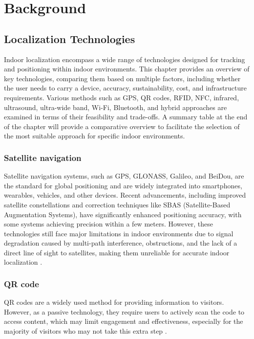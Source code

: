 \chapter{Background}
\label{chap:background}

\section{Localization Technologies}

Indoor localization encompass a wide range of technologies designed for tracking and positioning within indoor environments. This chapter provides an overview of key technologies, comparing them based on multiple factors, including whether the user needs to carry a device, accuracy, sustainability, cost, and infrastructure requirements. Various methods such as GPS, QR codes, RFID, NFC, infrared, ultrasound, ultra-wide band, Wi-Fi, Bluetooth, and hybrid approaches are examined in terms of their feasibility and trade-offs. A summary table at the end of the chapter will provide a comparative overview to facilitate the selection of the most suitable approach for specific indoor environments.

\subsection{Satellite navigation}

Satellite navigation systems, such as GPS, GLONASS, Galileo, and BeiDou, are the standard for global positioning and are widely integrated into smartphones, wearables, vehicles, and other devices. Recent advancements, including improved satellite constellations and correction techniques like SBAS (Satellite-Based Augmentation Systems), have significantly enhanced positioning accuracy, with some systems achieving precision within a few meters. However, these technologies still face major limitations in indoor environments due to signal degradation caused by multi-path interference, obstructions, and the lack of a direct line of sight to satellites, making them unreliable for accurate indoor localization \cite{mainetti_survey_2014}. 

\subsection{QR code}

QR codes are a widely used method for providing information to visitors. However, as a passive technology, they require users to actively scan the code to access content, which may limit engagement and effectiveness, especially for the majority of visitors who may not take this extra step \cite{spachos_ble_2020}. 

